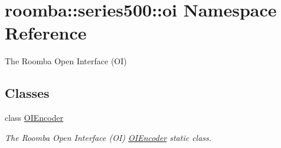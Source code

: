 \hypertarget{namespaceroomba_1_1series500_1_1oi}{\section{roomba\+:\+:series500\+:\+:oi Namespace Reference}
\label{namespaceroomba_1_1series500_1_1oi}
}


The Roomba Open Interface (O\+I)  


\subsection*{Classes}
\begin{DoxyCompactItemize}
\item 
class \hyperlink{classroomba_1_1series500_1_1oi_1_1_o_i_encoder}{O\+I\+Encoder}
\begin{DoxyCompactList}\small\item\em The Roomba Open Interface (O\+I) \hyperlink{classroomba_1_1series500_1_1oi_1_1_o_i_encoder}{O\+I\+Encoder} static class. \end{DoxyCompactList}\end{DoxyCompactItemize}
